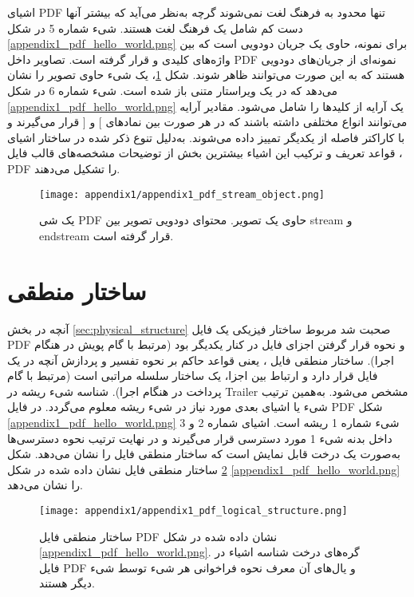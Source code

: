 اشیای \gls{PDF}
 تنها محدود به فرهنگ لغت نمی‌شوند گرچه به‌نظر می‌آید که بیشتر آنها دست کم شامل یک فرهنگ لغت هستند. شیء شماره 5 در شکل \ref{appendix1_pdf_hello_world.png} برای نمونه، حاوی یک جریان دودویی است که بین واژه‌های کلیدی  و  قرار گرفته است. تصاویر داخل \gls{PDF}
  نمونه‌ای از جریان‌های دودویی هستند که به این صورت می‌توانند ظاهر شوند. ‏شکل \ref{appendix1_pdf_stream_object.png}، یک شیء حاوی تصویر را نشان می‌دهد که در یک ویراستار متنی باز شده است.  شیء شماره 6 در شکل \ref{appendix1_pdf_hello_world.png} یک آرایه از کلید‌ها را شامل می‌شود. مقادیر آرایه می‌توانند انواع مختلفی داشته باشند که در هر صورت بین نمادهای $ [$  و $ ] $ قرار می‌گیرند و با کاراکتر فاصله از یکدیگر تمییز داده می‌شوند. به‌دلیل تنوع ذکر شده در ساختار اشیای ، قواعد تعریف و ترکیب این اشیاء بیشترین بخش از توضیحات مشخصه‌های قالب فایل \gls{PDF}
  را تشکیل می‌دهند.


\begin{figure}%
	\centering
	\texttt{[image: appendix1/appendix1\_pdf\_stream\_object.png]}
	\caption[یک شیء \gls*{PDF} حاوی جریان دودویی]
	{
		یک شی \gls*{PDF}
		 حاوی یک تصویر. محتوای دودویی تصویر بین stream و endstream قرار گرفته است.
	}
	\label{appendix1_pdf_stream_object.png}
\end{figure}

 
\section{ساختار منطقی}

آنچه در بخش \ref{sec:physical_structure} صحبت شد مربوط ساختار فیزیکی یک فایل \gls{PDF}
و نحوه قرار گرفتن اجزای فایل در کنار یکدیگر بود (مرتبط با گام پویش در هنگام اجرا). ساختار منطقی فایل ، یعنی قواعد حاکم بر نحوه تفسیر و پردازش آنچه در یک فایل قرار دارد و ارتباط بین اجزا، یک ساختار سلسله مراتبی است (مرتبط با گام پرداخت در هنگام اجرا). شناسه شیء ریشه در Trailer مشخص می‌شود. به‌همین ترتیب شیء یا اشیای بعدی مورد نیاز در شیء ریشه معلوم می‌گردد. در فایل \gls{PDF}
شکل \ref{appendix1_pdf_hello_world.png} شیء شماره 1 ریشه است. اشیای شماره 2 و 3 داخل بدنه شیء 1 مورد دسترسی قرار می‌گیرند و در نهایت ترتیب نحوه دسترسی‌ها به‌صورت یک درخت قابل نمایش است که ساختار منطقی فایل را نشان می‌دهد. ‏شکل \ref{appendix1_pdf_logical_structure.png} ساختار منطقی فایل نشان داده شده در ‏شکل \ref{appendix1_pdf_hello_world.png} را نشان می‌دهد.


\begin{figure}%
	\centering
	\texttt{[image: appendix1/appendix1\_pdf\_logical\_structure.png]}
	\caption[نمایش درختی ساختار منطقی فایل \gls*{PDF}]
	{
		ساختار منطقی فایل \gls*{PDF}
		 نشان داده شده در شکل \ref{appendix1_pdf_hello_world.png}. گره‌های درخت شناسه اشیاء در فایل \gls*{PDF}
		  و یال‌های آن معرف نحوه فراخوانی هر شی‌ء توسط شی‌ء دیگر هستند.
	}
	\label{appendix1_pdf_logical_structure.png}
\end{figure}



